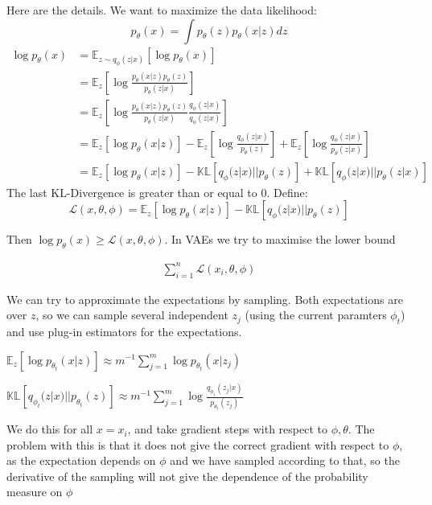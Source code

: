 \documentclass[english]{article}
\begin{document}

\item 

Here are the details. We want to maximize the data likelihood:
\begin{equation*}
	p_{\theta}(x) = \int p_{\theta}(z)p_{\theta}(x|z)dz
\end{equation*}
\begin{align*}
	\log p_{\theta}(x) &= \mathbb{E}_{z\sim q_{\phi}(z|x)}[\log p_{\theta}(x)]\\
	&=\mathbb{E}_{z}[\log\frac{p_{\theta}(x|z)p_{\theta}(z)}{p_{\theta}(z|x)}]\\
	&=\mathbb{E}_{z}[\log\frac{p_{\theta}(x|z)p_{\theta}(z)}{p_{\theta}(z|x)}\frac{q_{\phi}(z|x)}{q_{\phi}(z|x)}]\\
	&=\mathbb{E}_{z}[\log p_{\theta}(x|z)] - \mathbb{E}_{z}[\log\frac{q_{\phi}(z|x)}{p_{\theta}(z)}] + \mathbb{E}_{z}[\log\frac{q_{\phi}(z|x)}{p_{\theta}(z|x)}]\\
	&=\mathbb{E}_{z}[\log p_{\theta}(x|z)] - \mathbb{KL}[q_{\phi}(z|x)||p_{\theta}(z)] + \mathbb{KL}[q_{\phi}(z|x)||p_{\theta}(z|x)]
\end{align*}
The last KL-Divergence is greater than or equal to 0. Define:
\begin{equation*}
	\mathcal{L}(x, \theta, \phi) = \mathbb{E}_{z}[\log p_{\theta}(x|z)] - \mathbb{KL}[q_{\phi}(z|x)||p_{\theta}(z)]
\end{equation*}

Then $\log p_{\theta}(x) \geq \mathcal{L}(x, \theta, \phi)$. 
In VAEs we try to maximise the lower bound

\begin{align*}
\sum_{i=1}^n \mathcal{L}(x_i, \theta, \phi)
\end{align*}

We can try to approximate the expectations by sampling. Both expectations are over $z$, so we can sample several independent $z_j$ (using the current paramters $\phi_t$) and use plug-in estimators for the expectations. 


$\mathbb{E}_{z}[\log p_{\theta_t}(x|z)]
\approx
m^{-1}\sum_{j=1}^m \log p_{\theta_t}(x|z_j)
$

$
\mathbb{KL}[q_{\phi_t}(z|x)||p_{\theta_t}(z)]\approx
m^{-1}\sum_{j=1}^m
\log\frac{q_{\phi_t}(z_j|x)}{p_{\theta_t}(z_j)}
$

We do this for all $x=x_i$, and take gradient steps with respect to $\phi,\theta$. The problem with this is that it does not give the correct gradient with respect to $\phi$, as the expectation depends on $\phi$ and we have sampled according to that, so the derivative of the sampling will not give the dependence of the probability measure on $\phi$
\end{document}
